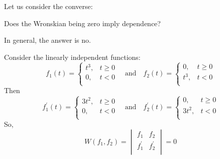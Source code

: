 \documentclass{beamer}
\begin{document}
\begin{frame}
\begin{example}
Let us consider the converse:\begin{center}Does the Wronskian being zero imply dependence?\end{center}\pause

In general, the answer is no.\pause

\vspace{2mm}
Consider the linearly independent functions:
\begin{equation*}
f_1(t)=
\begin{cases}
t^3, & t\geq 0 \\
0,   & t<0     \\
\end{cases}
\quad\text{and}\quad
f_2(t)=
\begin{cases}
0,   & t\geq 0 \\
t^3, & t<0     \\
\end{cases}
\end{equation*}\pause
Then
\begin{equation*}
f_1^\prime(t)=
\begin{cases}
3t^2, & t\geq 0 \\
0,   & t<0     \\
\end{cases}
\quad\text{and}\quad
f_2^\prime(t)=
\begin{cases}
0,   & t\geq 0 \\
3t^2, & t<0     \\
\end{cases}
\end{equation*}\pause
So,
\begin{equation*}
W(f_1,f_2) = 
\begin{vmatrix}
f_1        & f_2        \\
f_1^\prime & f_2^\prime \\
\end{vmatrix}
=0
\end{equation*}
\end{example}
\end{frame}
\end{document}
